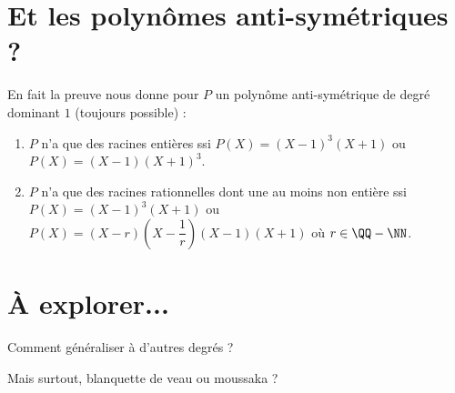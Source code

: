 \documentclass[12pt]{amsart}
\begin{document}
\section{Et les polynômes anti-symétriques ?}

En fait la preuve nous donne pour $P$ un polynôme anti-symétrique de degré dominant $1$ (toujours possible) :

\begin{enumerate}
	\item $P$ n'a que des racines entières ssi $P(X) = (X - 1)^3 (X + 1)$ ou $P(X) = (X - 1) (X + 1)^3$.

	\item $P$ n'a que des racines rationnelles dont une au moins non entière ssi $P(X) = (X - 1)^3 (X + 1)$ ou $P(X) = (X - r) \left( X - \dfrac1r \right) (X - 1) (X + 1)$ où $r \in \QQ - \NN$.
\end{enumerate}




\section{À explorer...}

Comment généraliser à d'autres degrés ?

\medskip

Mais surtout, blanquette de veau ou moussaka ?
\end{document}
